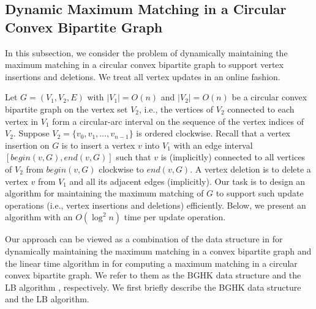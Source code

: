\documentclass[11pt]{article}
\begin{document}
\subsection{Dynamic Maximum Matching in a Circular Convex Bipartite Graph}

In this subsection, we consider the problem of dynamically maintaining the
maximum matching in a circular convex bipartite graph to support vertex
insertions and deletions. We treat all vertex updates in an online fashion.

Let $G = (V_1, V_2, E)$ with $|V_1|= O(n)$ and $|V_2|=O(n)$ be a circular convex
bipartite graph on the vertex set $V_2$, i.e., the vertices of $V_2$
connected to each vertex in $V_1$ form a circular-arc interval on the
sequence of the vertex indices of $V_2$. Suppose
$V_2=\{v_0,v_1,\ldots,v_{n-1}\}$ is ordered clockwise. Recall that a
vertex insertion on $G$ is to insert a vertex $v$ into $V_1$ with an edge interval
$[begin(v,G),end(v,G)]$ such that $v$ is (implicitly) connected to all
vertices of $V_2$ from $begin(v,G)$ clockwise to $end(v,G)$.
A vertex deletion is to delete a
vertex $v$ from $V_1$ and all its adjacent edges (implicitly).  Our
task is to design an algorithm for maintaining the maximum matching of
$G$ to support such update operations (i.e., vertex insertions and
deletions) efficiently. Below, we present an algorithm with an $O(\log^2n)$ time per
update operation.


Our approach can be viewed as a combination of the data structure in
\cite{ref:BrodalDy07} for dynamically maintaining the maximum
matching in a convex bipartite graph and the linear time algorithm
in \cite{ref:LiangCi95} for computing a maximum matching in a
circular convex bipartite graph. We refer to them as the BGHK data
structure \cite{ref:BrodalDy07} and the LB algorithm
\cite{ref:LiangCi95}, respectively. We first briefly describe
the BGHK data structure and the LB algorithm.
\end{document}
